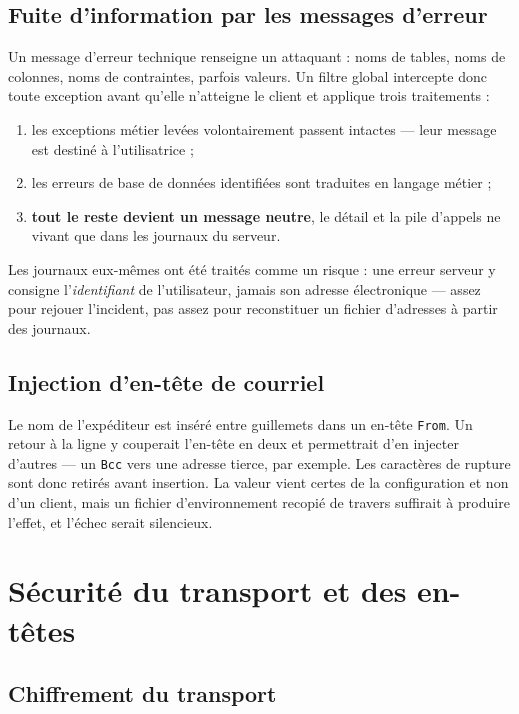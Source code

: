 \subsection{Fuite d'information par les messages d'erreur}

Un message d'erreur technique renseigne un attaquant : noms de tables, noms de
colonnes, noms de contraintes, parfois valeurs. Un filtre global intercepte
donc toute exception avant qu'elle n'atteigne le client et applique trois
traitements :

\begin{enumerate}[leftmargin=1.2cm]
  \item les exceptions métier levées volontairement passent intactes --- leur
  message est destiné à l'utilisatrice ;
  \item les erreurs de base de données identifiées sont traduites en langage
  métier ;
  \item \textbf{tout le reste devient un message neutre}, le détail et la pile
  d'appels ne vivant que dans les journaux du serveur.
\end{enumerate}

Les journaux eux-mêmes ont été traités comme un risque : une erreur serveur y
consigne l'\emph{identifiant} de l'utilisateur, jamais son adresse
électronique --- assez pour rejouer l'incident, pas assez pour reconstituer un
fichier d'adresses à partir des journaux.

\subsection{Injection d'en-tête de courriel}

Le nom de l'expéditeur est inséré entre guillemets dans un en-tête
\texttt{From}. Un retour à la ligne y couperait l'en-tête en deux et
permettrait d'en injecter d'autres --- un \texttt{Bcc} vers une adresse
tierce, par exemple. Les caractères de rupture sont donc retirés avant
insertion. La valeur vient certes de la configuration et non d'un client, mais
un fichier d'environnement recopié de travers suffirait à produire l'effet, et
l'échec serait silencieux.

\section{Sécurité du transport et des en-têtes}

\subsection{Chiffrement du transport}

